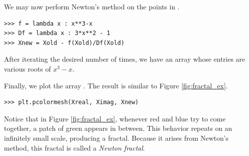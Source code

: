 We may now perform Newton's method on the points in . 
\begin{lstlisting}
>>> f = lambda x : x**3-x
>>> Df = lambda x : 3*x**2 - 1
>>> Xnew = Xold - f(Xold)/Df(Xold)
\end{lstlisting}
After iterating the desired number of times, we have an array  whose entries are various roots of $x^3-x$.

Finally, we plot the array . The result is similar to Figure \ref{fig:fractal_ex}.
\begin{lstlisting}
>>> plt.pcolormesh(Xreal, Ximag, Xnew)
\end{lstlisting}

Notice that in Figure \ref{fig:fractal_ex}, whenever red and blue try to come together, a patch of green appears in between.
This behavior repeats on an infinitely small scale, producing a fractal.
Because it arises from Newton's method, this fractal is called a \emph{Newton fractal}.

